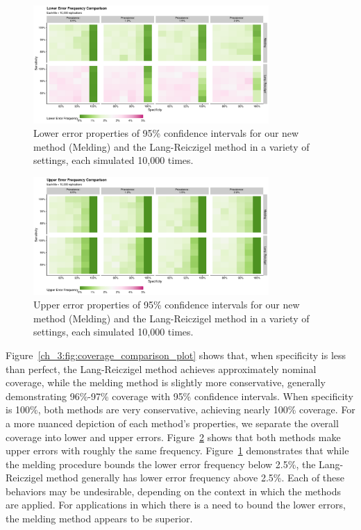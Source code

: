 \begin{figure}
    \centering
    \includegraphics[width=0.8\textwidth]{simple_lower_error_frequency_comparison_plot}
    \caption{Lower error properties of 95\% confidence intervals for our new method (Melding) and the Lang-Reiczigel method in a variety of settings, each simulated 10,000 times.}
    \label{ch_3:fig:lower_error_frequency_comparison_plot}
\end{figure}

\begin{figure}
    \centering
    \includegraphics[width=0.8\textwidth]{simple_upper_error_frequency_comparison_plot}
    \caption{Upper error properties of 95\% confidence intervals for our new method (Melding) and the Lang-Reiczigel method in a variety of settings, each simulated 10,000 times.}
    \label{ch_3:fig:upper_error_frequency_comparison_plot}
\end{figure}

Figure~\ref{ch_3:fig:coverage_comparison_plot} shows that, when specificity is less than perfect, the Lang-Reiczigel method achieves approximately nominal coverage, while the melding method is slightly more conservative, generally demonstrating 96\%-97\% coverage with 95\% confidence intervals.
When specificity is 100\%, both methods are very conservative, achieving nearly 100\% coverage.
For a more nuanced depiction of each method's properties, we separate the overall coverage into lower and upper errors.
Figure~\ref{ch_3:fig:upper_error_frequency_comparison_plot} shows that both methods make upper errors with roughly the same frequency.
Figure~\ref{ch_3:fig:lower_error_frequency_comparison_plot} demonstrates that while the melding procedure bounds the lower error frequency below 2.5\%, the Lang-Reiczigel method generally has lower error frequency above 2.5\%.
Each of these behaviors may be undesirable, depending on the context in which the methods are applied.
For applications in which there is a need to bound the lower errors, the melding method appears to be superior.


